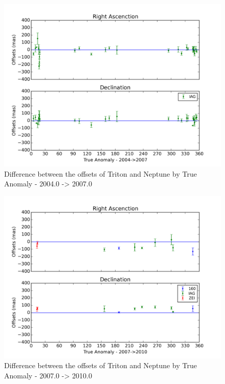 \documentclass[12pt,a4paper]{report}
\begin{document}
\begin{figure}
\includegraphics[width=14.0cm]{Anom_TN_2004-2007.png} 
\caption{Difference between the offsets of Triton and Neptune by True Anomaly - 2004.0 -> 2007.0}
\label{Fig:triton-netuno-2004}
\end{figure}
\begin{figure}
\includegraphics[width=14.0cm]{Anom_TN_2007-2010.png} 
\caption{Difference between the offsets of Triton and Neptune by True Anomaly - 2007.0 -> 2010.0}
\label{Fig:triton-netuno-2007}
\end{figure}
\end{document}
